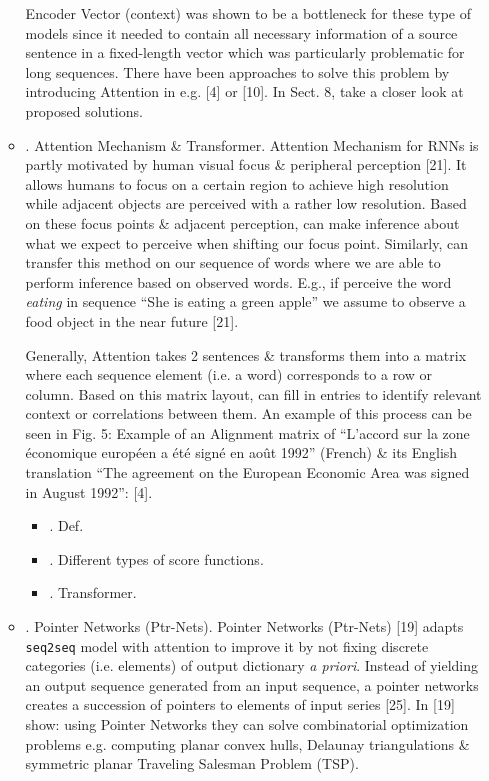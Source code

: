 \documentclass{article}
\begin{document}
\begin{enumerate}
\begin{itemize}
		Encoder Vector (context) was shown to be a bottleneck for these type of models since it needed to contain all necessary information of a source sentence in a fixed-length vector which was particularly problematic for long sequences. There have been approaches to solve this problem by introducing Attention in e.g. [4] or [10]. In Sect. 8, take a closer look at proposed solutions.
		\item {. Attention Mechanism \& Transformer.} Attention Mechanism for RNNs is partly motivated by human visual focus \& peripheral perception [21]. It allows humans to focus on a certain region to achieve high resolution while adjacent objects are perceived with a rather low resolution. Based on these focus points \& adjacent perception, can make inference about what we expect to perceive when shifting our focus point. Similarly, can transfer this method on our sequence of words where we are able to perform inference based on observed words. E.g., if perceive the word {\it eating} in sequence ``She is eating a green apple'' we assume to observe a food object in the near future [21].
		
		Generally, Attention takes 2 sentences \& transforms them into a matrix where each sequence element (i.e. a word) corresponds to a row or column. Based on this matrix layout, can fill in entries to identify relevant context or correlations between them. An example of this process can be seen in {\sf Fig. 5: Example of an Alignment matrix of ``L'accord sur la zone économique européen a été signé en août 1992'' (French) \& its English translation ``The agreement on the European Economic Area was signed in August 1992'': [4].}
		\begin{itemize}
			\item {. Def.}
			\item {. Different types of score functions.}
			\item {. Transformer.}
		\end{itemize}
		\item {. Pointer Networks (Ptr-Nets).} Pointer Networks (Ptr-Nets) [19] adapts {\tt seq2seq} model with attention to improve it by not fixing discrete categories (i.e. elements) of output dictionary {\it a priori}. Instead of yielding an output sequence generated from an input sequence, a pointer networks creates a succession of pointers to elements of input series [25]. In [19] show: using Pointer Networks they can solve combinatorial optimization problems e.g. computing planar convex hulls, Delaunay triangulations \& symmetric planar Traveling Salesman Problem (TSP).
		

\end{itemize}
\end{enumerate}
\end{document}

